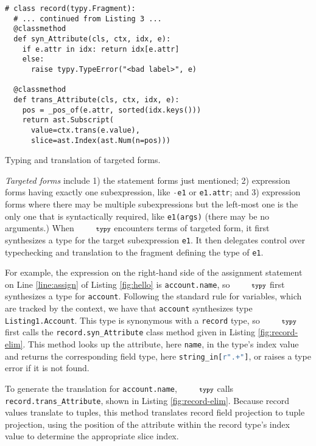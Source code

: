 \documentclass[10pt]{sigplanconf}
\newcommand{\typy}{\texttt{\footnotesize typy}}
\newcommand{\lip}[1]{\lstinline[language=Python,basicstyle=\ttfamily\footnotesize,morekeywords={with},deletendkeywords={tuple,buffer,map}]{#1}}
\newcommand{\li}[1]{\lip{#1}}
\begin{document}
\begin{codelisting}[t]
\vspace{-3px}
\begin{lstlisting}[deletendkeywords={slice}]
# class record(typy.Fragment): 
  # ... continued from Listing 3 ...
  @classmethod
  def syn_Attribute(cls, ctx, idx, e):
    if e.attr in idx: return idx[e.attr]
    else:
      raise typy.TypeError("<bad label>", e)

  @classmethod
  def trans_Attribute(cls, ctx, idx, e): 
    pos = _pos_of(e.attr, sorted(idx.keys()))
    return ast.Subscript(
      value=ctx.trans(e.value),
      slice=ast.Index(ast.Num(n=pos)))
\end{lstlisting}
\caption{Typing and translation of targeted forms.}
\label{fig:record-elim}
\end{codelisting}
\emph{Targeted forms} include 1) the statement forms just mentioned; 2) expression forms having exactly one subexpression, like \lip{-e1} or \lip{e1.attr}; and 3) expression forms where there may be multiple subexpressions but the left-most one is the only one that is syntactically required, like \lip{e1(args)} (there may be no arguments.) When $\typy$ encounters terms of targeted form, it first synthesizes a type for the target subexpression \li{e1}. It then delegates control over typechecking and translation to the fragment defining the type of \li{e1}.

For example, the expression on the right-hand side of the assignment statement on Line \ref{line:assign} of Listing \ref{fig:hello} is \li{account.name}, so $\typy$ first synthesizes a type for \li{account}. Following the standard rule for variables, which are tracked by the context, we have that \li{account} synthesizes type \li{Listing1.Account}. This type is synonymous with a \li{record} type, so $\typy$ first calls the \li{record.syn_Attribute} class method given in Listing \ref{fig:record-elim}. This method looks up the attribute, here \li{name}, in the type's index value and returns the corresponding field type, here \li{string_in[r".+"]}, or raises a type error if it is not found.



To generate the translation for \li{account.name}, $\typy$ calls \li{record.trans_Attribute}, shown in Listing \ref{fig:record-elim}. Because record values translate to tuples, this method translates record field projection to tuple projection, using the position of the attribute within the record type's index value to determine the appropriate slice index.
\end{document}

